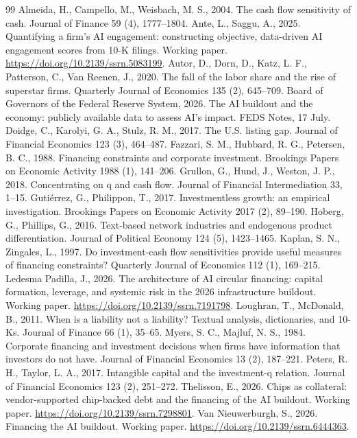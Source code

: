 \documentclass[preprint,11pt]{elsarticle}
\begin{document}
\begin{thebibliography}{99}
 Almeida, H., Campello, M., Weisbach, M. S., 2004. The cash flow sensitivity of cash. Journal of Finance 59 (4), 1777--1804.
 Ante, L., Saggu, A., 2025. Quantifying a firm's AI engagement: constructing objective, data-driven AI engagement scores from 10-K filings. Working paper. \url{https://doi.org/10.2139/ssrn.5083199}.
 Autor, D., Dorn, D., Katz, L. F., Patterson, C., Van Reenen, J., 2020. The fall of the labor share and the rise of superstar firms. Quarterly Journal of Economics 135 (2), 645--709.
 Board of Governors of the Federal Reserve System, 2026. The AI buildout and the economy: publicly available data to assess AI's impact. FEDS Notes, 17 July.
 Doidge, C., Karolyi, G. A., Stulz, R. M., 2017. The U.S. listing gap. Journal of Financial Economics 123 (3), 464--487.
 Fazzari, S. M., Hubbard, R. G., Petersen, B. C., 1988. Financing constraints and corporate investment. Brookings Papers on Economic Activity 1988 (1), 141--206.
 Grullon, G., Hund, J., Weston, J. P., 2018. Concentrating on q and cash flow. Journal of Financial Intermediation 33, 1--15.
 Guti\'errez, G., Philippon, T., 2017. Investmentless growth: an empirical investigation. Brookings Papers on Economic Activity 2017 (2), 89--190.
 Hoberg, G., Phillips, G., 2016. Text-based network industries and endogenous product differentiation. Journal of Political Economy 124 (5), 1423--1465.
 Kaplan, S. N., Zingales, L., 1997. Do investment-cash flow sensitivities provide useful measures of financing constraints? Quarterly Journal of Economics 112 (1), 169--215.
 Ledesma Padilla, J., 2026. The architecture of AI circular financing: capital formation, leverage, and systemic risk in the 2026 infrastructure buildout. Working paper. \url{https://doi.org/10.2139/ssrn.7191798}.
 Loughran, T., McDonald, B., 2011. When is a liability not a liability? Textual analysis, dictionaries, and 10-Ks. Journal of Finance 66 (1), 35--65.
 Myers, S. C., Majluf, N. S., 1984. Corporate financing and investment decisions when firms have information that investors do not have. Journal of Financial Economics 13 (2), 187--221.
 Peters, R. H., Taylor, L. A., 2017. Intangible capital and the investment-q relation. Journal of Financial Economics 123 (2), 251--272.
 Thelisson, E., 2026. Chips as collateral: vendor-supported chip-backed debt and the financing of the AI buildout. Working paper. \url{https://doi.org/10.2139/ssrn.7298801}.
 Van Nieuwerburgh, S., 2026. Financing the AI buildout. Working paper. \url{https://doi.org/10.2139/ssrn.6444363}.
\end{thebibliography}
\end{document}
